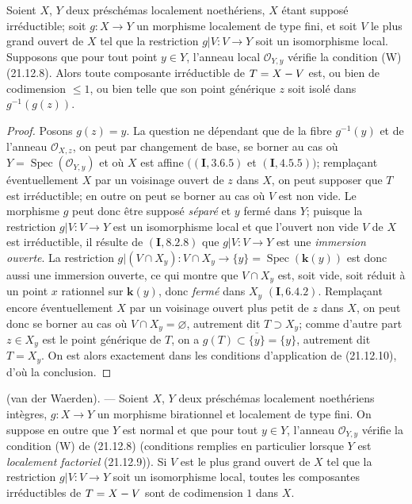 \begin{corollary}[21.12.11]
\label{IV.21.12.11}
Soient $X$, $Y$ deux préschémas localement noethériens, $X$ étant supposé
irréductible; soit $g:X\to Y$ un morphisme localement de type fini, et soit $V$ le plus
grand ouvert de $X$ tel que la restriction $g|V:V\to Y$ soit un isomorphisme local.
Supposons que pour tout point $y\in Y$, l'anneau local $\mathcal O_{Y,y}$ vérifie la
condition \textup{(W) (21.12.8)}. Alors toute composante irréductible de $T=X- V$ est, \textup{ou bien}
de codimension $\leq1$, \textup{ou bien} telle que son point générique $z$ soit isolé dans
$g^{-1}(g(z))$.
\end{corollary}

\begin{proof}
Posons $g(z)=y$. La question ne dépendant que de la fibre $g^{-1}(y)$ et de l'anneau
$\mathcal O_{X,z}$, on peut par changement de base, se borner au cas où
$Y=\operatorname{Spec}(\mathcal O_{Y,y})$ et où $X$ est affine
$((\mathbf I, 3.6.5)$ et $(\mathbf I, 4.5.5))$; remplaçant éventuellement $X$ par un
voisinage ouvert de $z$ dans $X$, on peut supposer que $T$ est irréductible; en outre on
peut se borner au cas où $V$ est non vide. Le morphisme $g$ peut donc être supposé
\emph{séparé} et $y$ fermé dans $Y$; puisque la restriction $g|V:V\to Y$ est un isomorphisme
local et que l'ouvert non vide $V$ de $X$ est irréductible, il résulte de
$(\mathbf I, 8.2.8)$ que $g|V:V\to Y$ est une \emph{immersion ouverte}. La restriction
$g|(V\cap X_y):V\cap X_y\to\{y\}=\operatorname{Spec}(\boldsymbol{k}(y))$ est donc aussi une
immersion ouverte, ce qui montre que $V\cap X_y$ est, soit vide, soit réduit à un point
$x$ rationnel
sur $\boldsymbol{k}(y)$, donc \emph{fermé} dans $X_y$ $(\mathbf I, 6.4.2)$. Remplaçant encore
éventuellement $X$ par un voisinage ouvert plus petit de $z$ dans $X$, on peut donc se
borner au cas où $V\cap X_y=\varnothing$, autrement dit $T\supset X_y$; comme d'autre
part $z\in X_y$ est le point générique de $T$, on a
$g(T)\subset\overline{\{y\}}=\{y\}$, autrement dit $T=X_y$. On est alors exactement
dans les conditions d'application de (21.12.10), d'où la conclusion.
\end{proof}

\begin{theorem}[21.12.12]
\label{IV.21.12.12}
\textup{(van der Waerden)}. ---
Soient $X$, $Y$ deux préschémas localement noethériens intègres, $g:X\to Y$ un
morphisme birationnel et localement de type fini. On suppose en outre que $Y$ est
normal et que pour tout $y\in Y$, l'anneau $\mathcal O_{Y,y}$ vérifie la condition \textup{(W)}
de \textup{(21.12.8)} \textup{(conditions remplies en particulier lorsque $Y$ est \emph{localement factoriel}
(21.12.9))}. Si $V$ est le plus grand ouvert de $X$ tel que la restriction
$g|V:V\to Y$ soit un isomorphisme local, toutes les composantes irréductibles de
$T=X- V$ sont de codimension $1$ dans $X$.
\end{theorem}

